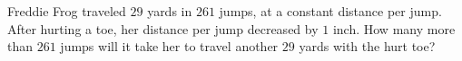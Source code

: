 Freddie Frog traveled $29$ yards in $261$ jumps, at a constant distance per jump. After hurting a toe, her distance per jump decreased by $1$ inch. How many more than $261$ jumps will it take her to travel another $29$ yards with the hurt toe?
